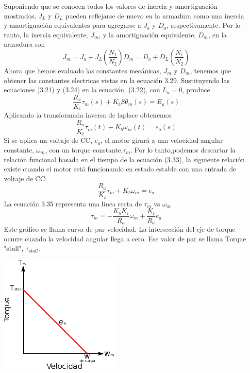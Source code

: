 Suponiendo que se conocen todos los valores de inercia y amortiguación mostrados, $J_L$ y $D_L$ pueden reflejarse de nuevo en la
armadura como una inercia y amortiguación equivalentes para agregarse a $J_a$ y $D_a$, respectivamente. Por lo tanto, la inercia
equivalente, $J_m$, y la amortiguación equivalente, $D_m$, en la armadura son
\begin{subequations}
	\begin{equation}
		J_m = J_a + J_L \left( \frac{N_1}{N_2} \right)
	\end{equation}
	\begin{equation}
		D_m = D_a + D_L\left( \frac{N_1}{N_2} \right)
	\end{equation}
\end{subequations}
Ahora que hemos evaluado las constantes mecánicas, $J_m$ y $D_m$, tenemos que obtener las constantes electricas vistas en la
ecuación 3.29. Sustituyendo las ecuaciones (3.21) y (3.24) en la ecuación. (3.22), con $L_a = 0$, produce
\begin{equation}
	\frac{R_a}{K_t} \tau_m (s) + K_bS\theta_m(s) = E_a(s)
\end{equation}
Aplicando la transformada inversa de laplace obtenemos
\begin{equation}
	\frac{R_a}{K_t} \tau_m (t) + K_b\omega_m(t) = e_a(s)
\end{equation}
Si se aplica un voltaje de CC, $e_a$, el motor girará a una velocidad angular constante, $\omega_m$, con un torque constante,$\tau_m$.
Por lo tanto,podemos descartar la relación funcional basada en el tiempo de la ecuación (3.33), la siguiente relación existe
cuando el motor está funcionando en estado estable con una entrada de voltaje de CC:
\begin{equation}
	\frac{R_a}{K_t} \tau_m + K_b\omega_m = e_a
\end{equation}
La ecuación 3.35 representa una linea recta de $\tau_m$ vs $\omega_m$
\begin{equation}
	\tau_m = -\frac{K_bK_t}{R_a} \omega_m + \frac{K_t}{R_a}e_a
\end{equation}
Este gráfico se llama curva de par-velocidad. La intersección del eje de torque ocurre cuando la velocidad angular llega a cero.
Ese valor de par se llama Torque "stall", $\tau_{stall}$.
\begin{center}
	\includegraphics[width=0.45\textwidth]{Contenido/Cuerpo/Capitulo3/Fig19.eps}
	\label{fig:ModeloMat:Fig1}
\end{center}
